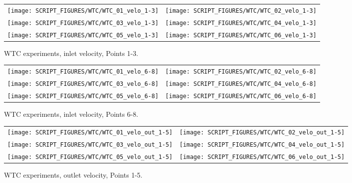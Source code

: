 \newpage

\begin{figure}[p]
\begin{tabular*}{\textwidth}{l@{\extracolsep{\fill}}r}
\texttt{[image: SCRIPT\_FIGURES/WTC/WTC\_01\_velo\_1-3]} &
\texttt{[image: SCRIPT\_FIGURES/WTC/WTC\_02\_velo\_1-3]} \\
\texttt{[image: SCRIPT\_FIGURES/WTC/WTC\_03\_velo\_1-3]} &
\texttt{[image: SCRIPT\_FIGURES/WTC/WTC\_04\_velo\_1-3]} \\
\texttt{[image: SCRIPT\_FIGURES/WTC/WTC\_05\_velo\_1-3]} &
\texttt{[image: SCRIPT\_FIGURES/WTC/WTC\_06\_velo\_1-3]}
\end{tabular*}
\caption[WTC experiments, inlet velocity, Points 1-3]{WTC experiments, inlet velocity, Points 1-3.}
\label{WTC_velo_1-3}
\end{figure}

\begin{figure}[p]
\begin{tabular*}{\textwidth}{l@{\extracolsep{\fill}}r}
\texttt{[image: SCRIPT\_FIGURES/WTC/WTC\_01\_velo\_6-8]} &
\texttt{[image: SCRIPT\_FIGURES/WTC/WTC\_02\_velo\_6-8]} \\
\texttt{[image: SCRIPT\_FIGURES/WTC/WTC\_03\_velo\_6-8]} &
\texttt{[image: SCRIPT\_FIGURES/WTC/WTC\_04\_velo\_6-8]} \\
\texttt{[image: SCRIPT\_FIGURES/WTC/WTC\_05\_velo\_6-8]} &
\texttt{[image: SCRIPT\_FIGURES/WTC/WTC\_06\_velo\_6-8]}
\end{tabular*}
\caption[WTC experiments, inlet velocity, Points 6-8]{WTC experiments, inlet velocity, Points 6-8.}
\label{WTC_velo_6-8}
\end{figure}

\begin{figure}[p]
\begin{tabular*}{\textwidth}{l@{\extracolsep{\fill}}r}
\texttt{[image: SCRIPT\_FIGURES/WTC/WTC\_01\_velo\_out\_1-5]} &
\texttt{[image: SCRIPT\_FIGURES/WTC/WTC\_02\_velo\_out\_1-5]} \\
\texttt{[image: SCRIPT\_FIGURES/WTC/WTC\_03\_velo\_out\_1-5]} &
\texttt{[image: SCRIPT\_FIGURES/WTC/WTC\_04\_velo\_out\_1-5]} \\
\texttt{[image: SCRIPT\_FIGURES/WTC/WTC\_05\_velo\_out\_1-5]} &
\texttt{[image: SCRIPT\_FIGURES/WTC/WTC\_06\_velo\_out\_1-5]}
\end{tabular*}
\caption[WTC experiments, outlet velocity, Points 1-5]{WTC experiments, outlet velocity, Points 1-5.}
\label{WTC_velo_out_1-5}
\end{figure}

